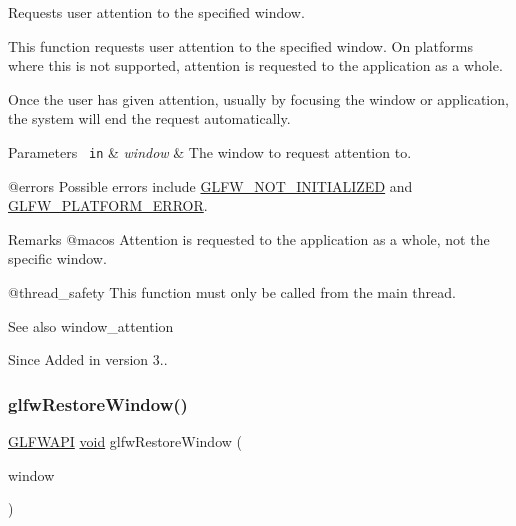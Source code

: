Requests user attention to the specified window. 

This function requests user attention to the specified window. On platforms where this is not supported, attention is requested to the application as a whole.

Once the user has given attention, usually by focusing the window or application, the system will end the request automatically.


\begin{DoxyParams}[1]{Parameters}
\mbox{\texttt{ in}}  & {\em window} & The window to request attention to.\\
\hline
\end{DoxyParams}
@errors Possible errors include \mbox{\hyperlink{group__errors_ga2374ee02c177f12e1fa76ff3ed15e14a}{G\+L\+F\+W\+\_\+\+N\+O\+T\+\_\+\+I\+N\+I\+T\+I\+A\+L\+I\+Z\+ED}} and \mbox{\hyperlink{group__errors_gad44162d78100ea5e87cdd38426b8c7a1}{G\+L\+F\+W\+\_\+\+P\+L\+A\+T\+F\+O\+R\+M\+\_\+\+E\+R\+R\+OR}}.

\begin{DoxyRemark}{Remarks}
@macos Attention is requested to the application as a whole, not the specific window.
\end{DoxyRemark}
@thread\+\_\+safety This function must only be called from the main thread.

\begin{DoxySeeAlso}{See also}
window\+\_\+attention
\end{DoxySeeAlso}
\begin{DoxySince}{Since}
Added in version 3.. 
\end{DoxySince}
\mbox{\label{group__window_ga1e29caf0b819f578b04db52fff17256c}} 
\subsubsection{\texorpdfstring{glfwRestoreWindow()}{glfwRestoreWindow()}}
{\footnotesize\ttfamily \mbox{\hyperlink{glfw3_8h_a56da5036b2cc259351ae22fd6439bb47}{G\+L\+F\+W\+A\+PI}} \mbox{\hyperlink{glad_8h_a950fc91edb4504f62f1c577bf4727c29}{void}} glfw\+Restore\+Window (\begin{DoxyParamCaption}\item[{\mbox{\hyperlink{group__window_ga3c96d80d363e67d13a41b5d1821f3242}{G\+L\+F\+Wwindow}} $\ast$}]{window }\end{DoxyParamCaption})}



